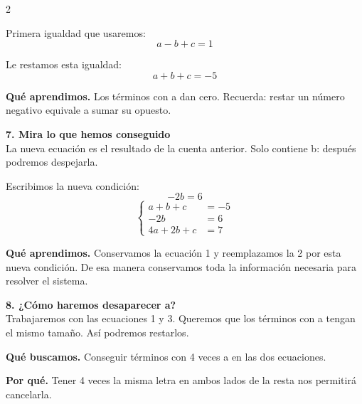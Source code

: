 \documentclass[11pt,a4paper,landscape]{article}
\begin{document}
\begin{multicols*}{2}
\begin{minipage}{\linewidth}
\par\smallskip Primera igualdad que usaremos:
\[a - b + c = 1\]
\par\smallskip Le restamos esta igualdad:
\[a + b + c = -5\]
\par\smallskip\textbf{Qué aprendimos.} Los términos con a dan cero. Recuerda: restar un número negativo equivale a sumar su opuesto.
\end{minipage}\par\medskip
\noindent\begin{minipage}{\linewidth}\textbf{7. Mira lo que hemos conseguido}\\[2pt]La nueva ecuación es el resultado de la cuenta anterior. Solo contiene b: después podremos despejarla.
\par\smallskip Escribimos la nueva condición:
\[-2b = 6\]
\[\left\{\begin{aligned}a + b + c &= -5\\-2b &= 6\\4a + 2b + c &= 7\end{aligned}\right.\]
\par\smallskip\textbf{Qué aprendimos.} Conservamos la ecuación 1 y reemplazamos la 2 por esta nueva condición. De esa manera conservamos toda la información necesaria para resolver el sistema.
\end{minipage}\par\medskip
\noindent\begin{minipage}{\linewidth}\textbf{8. ¿Cómo haremos desaparecer a?}\\[2pt]Trabajaremos con las ecuaciones 1 y 3. Queremos que los términos con a tengan el mismo tamaño. Así podremos restarlos.
\par\smallskip\textbf{Qué buscamos.} Conseguir términos con 4 veces a en las dos ecuaciones.
\par\smallskip\textbf{Por qué.} Tener 4 veces la misma letra en ambos lados de la resta nos permitirá cancelarla.
\par{}\par\smallskip

\end{minipage}
\end{multicols*}
\end{document}

